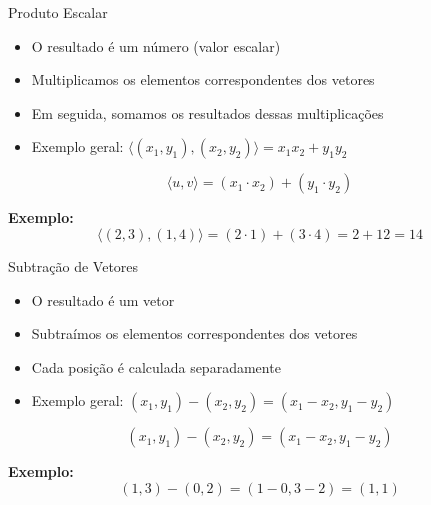 \documentclass{beamer}
\begin{document}
\begin{frame}{Produto Escalar}


\vspace{0.5cm}

\begin{itemize}
    \item O resultado é um número (valor escalar)
    \item Multiplicamos os elementos correspondentes dos vetores
    \item Em seguida, somamos os resultados dessas multiplicações
    \item Exemplo geral: $\langle (x_1, y_1), (x_2, y_2) \rangle = x_1x_2 + y_1y_2$
\end{itemize}

\vspace{0.5cm}

\[
\langle u, v \rangle = (x_1 \cdot x_2) + (y_1 \cdot y_2)
\]

\vspace{0.5cm}

\textbf{Exemplo:}
\[
\langle (2,3), (1,4) \rangle = (2 \cdot 1) + (3 \cdot 4) = 2 + 12 = 14
\]

\end{frame}
\begin{frame}{Subtração de Vetores}


\vspace{0.5cm}

\begin{itemize}
    \item O resultado é um vetor
    \item Subtraímos os elementos correspondentes dos vetores
    \item Cada posição é calculada separadamente
    \item Exemplo geral: $(x_1, y_1) - (x_2, y_2) = (x_1 - x_2, y_1 - y_2)$
\end{itemize}

\vspace{0.5cm}

\[
(x_1, y_1) - (x_2, y_2) = (x_1 - x_2, y_1 - y_2)
\]

\vspace{0.5cm}

\textbf{Exemplo:}
\[
(1,3) - (0,2) = (1-0, 3-2) = (1,1)
\]

\end{frame}
\end{document}
